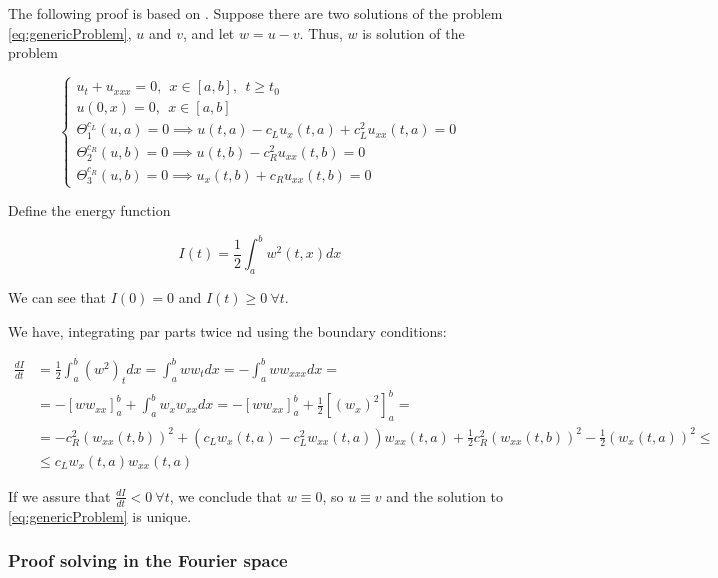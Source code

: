 \indent The following proof is based on \cite{energyMethod}. Suppose there are two solutions of the problem \eqref{eq:genericProblem}, $u$ and $v$, and let $w = u-v$. Thus, $w$ is solution of the problem

\begin{equation}
    \label{eq:genericProblemW}
    \begin{cases}
        u_t + u_{xxx} = 0 , \ \ x \in [a,b], \ \ t \geq t_0\\
        u(0,x)  = 0 , \ \ x \in [a,b] \\
        \Theta_1^{c_L}(u,a) = 0 \implies u(t,a) - c_L u_x(t,a) + c_L^2 u_{xx}(t,a) = 0\\ 
        \Theta_2^{c_R}(u,b) = 0 \implies u(t,b) - c_R^2 u_{xx}(t,b) = 0 \\
        \Theta_3^{c_R}(u,b) = 0 \implies u_x(t,b) + c_R u_{xx}(t,b) = 0
     \end{cases}
\end{equation}

\indent Define the energy function

\begin{equation*}
	I(t) = \frac{1}{2}\int_a^b{w^2(t,x)dx}
\end{equation*}

\indent We can see that $I(0) = 0$ and $I(t) \geq 0 \ \forall t$.

\indent We have, integrating par parts twice nd using the boundary conditions:

\begin{equation}
	\begin{aligned}
		\frac{dI}{dt} & =  \frac{1}{2}\int_a^b{(w^2)_t dx} = \int_a^b{w w_t dx} = - \int_a^b{w w_{xxx} dx}  = \\
							 & = - \left[ w w_{xx} \right]_a^b + \int_a^b{w_x w_{xx} dx} = - \left[ w w_{xx} \right]_a^b + \frac{1}{2} \left[ (w_{x})^2 \right]_a^b = \\
							 & = -c_R^2 (w_{xx}(t,b))^2 + (c_L w_x(t,a) - c_L^2 w_{xx}(t,a))w_{xx}(t,a) +  \frac{1}{2} c_R^2 (w_{xx}(t,b))^2 - \frac{1}{2}(w_{x}(t,a))^2 \leq \\
							 & \leq c_Lw_x(t,a)w_{xx}(t,a)
	\end{aligned}
\end{equation} 

\noindent If we assure that $\frac{dI}{dt} <0 \ \forall t$, we conclude that $w \equiv 0$, so $u \equiv v$ and the solution to \eqref{eq:genericProblem} is unique.


\subsubsection{Proof solving in the Fourier space}

